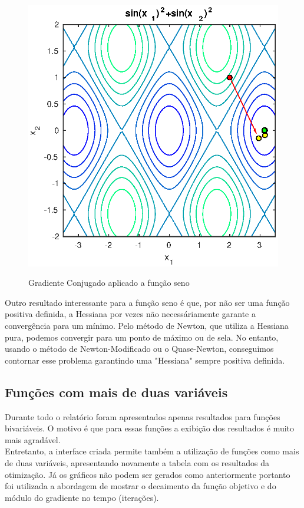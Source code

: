 \documentclass[a4paper,12pt,utf8x,notitlepage]{article}
\begin{document}
\begin{figure}[!htcb]
{\includegraphics[scale=0.6]{cgrad_level_sin}
\label{fig:subfigure2}}
\caption{Gradiente Conjugado aplicado a função seno}
\label{fig:res_cgrad_sin}
\end{figure}

Outro resultado interessante para a função seno é que, por não ser uma função positiva definida, a Hessiana por vezes não necessáriamente garante a convergência para um mínimo. Pelo método de Newton, que utiliza a Hessiana pura, podemos convergir para um ponto de máximo ou de sela. No entanto, usando o método de Newton-Modificado ou o Quase-Newton, conseguimos contornar esse problema garantindo uma "Hessiana" sempre positiva definida.

\subsection{Funções com mais de duas variáveis}

Durante todo o relatório foram apresentados apenas resultados para funções bivariáveis. O motivo é que para essas funções a exibição dos resultados é muito mais agradável.\\

Entretanto, a interface criada permite também a utilização de funções como mais de duas variáveis, apresentando novamente a tabela com os resultados da otimização. Já os gráficos não podem ser gerados como anteriormente portanto foi utilizada a abordagem de mostrar o decaimento da função objetivo e do módulo do gradiente no tempo (iterações).\\
\end{document}

